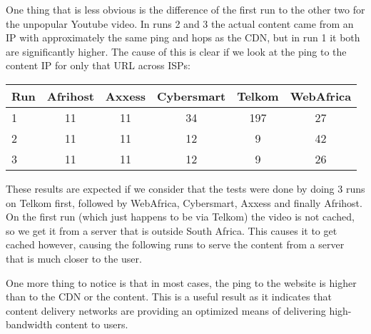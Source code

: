 \documentclass{sig-alternate-05-2015}
\begin{document}
One thing that is less obvious is the difference of the first run to the other two for the unpopular Youtube video. In runs 2 and 3 the actual content came from an IP with approximately the same ping and hops as the CDN, but in run 1 it both are significantly higher. The cause of this is clear if we look at the ping to the content IP for only that URL across ISPs:
\vspace{1em} \\
{\small
\begin{tabular}{|l|c|c|c|c|c|} \hline
Run & Afrihost & Axxess & Cybersmart & Telkom & WebAfrica \\ \hline
1 & 11 & 11  & 34  & 197 & 27 \\ \hline
2 & 11 & 11  & 12  & 9   & 42 \\ \hline
3 & 11 & 11  & 12  & 9   & 26 \\ \hline
\end{tabular}}
These results are expected if we consider that the tests were done by doing 3 runs on Telkom first, followed by WebAfrica, Cybersmart, Axxess and finally Afrihost. On the first run (which just happens to be via Telkom) the video is not cached, so we get it from a server that is outside South Africa. This causes it to get cached however, causing the following runs to serve the content from a server that is much closer to the user.

One more thing to notice is that in most cases, the ping to the website is higher than to the CDN or the content. This is a useful result as it indicates that content delivery networks are providing an optimized means of delivering high-bandwidth content to users.
\end{document}
